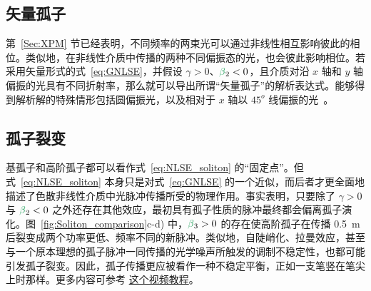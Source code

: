 \subsection{矢量孤子}
第~\ref{Sec:XPM} 节已经表明，不同频率的两束光可以通过非线性相互影响彼此的相位。类似地，在非线性介质中传播的两种不同偏振态的光，也会彼此影响相位。若采用矢量形式的式~\ref{eq:GNLSE}，并假设 $\gamma>0$、$\betag_2<0$，且介质对沿 $x$ 轴和 $y$ 轴偏振的光具有不同折射率，那么就可以导出所谓“矢量孤子”的解析表达式。能够得到解析解的特殊情形包括圆偏振光，以及相对于 $x$ 轴以 $45^o$ 线偏振的光~\cite{AGRAWAL_CH6_POL}。

\subsection{孤子裂变}
\label{subsec:fission}
基孤子和高阶孤子都可以看作式~\ref{eq:NLSE_soliton} 的“固定点”。但式~\ref{eq:NLSE_soliton} 本身只是对式~\ref{eq:GNLSE} 的一个近似，而后者才更全面地描述了色散非线性介质中光脉冲传播所受的物理作用。事实表明，只要除了 $\gamma>0$ 与 $\betag_2<0$ 之外还存在其他效应，最初具有孤子性质的脉冲最终都会偏离孤子演化。图~\ref{fig:Soliton_comparison}c-d) 中，$\betag_3>0$ 的存在使高阶孤子在传播 0.5~m 后裂变成两个功率更低、频率不同的新脉冲。类似地，自陡峭化、拉曼效应，甚至与一个原本理想的孤子脉冲一同传播的光学噪声所触发的调制不稳定性，也都可能引发孤子裂变。因此，孤子传播更应被看作一种不稳定平衡，正如一支笔竖在笔尖上时那样。更多内容可参考 \href{https://youtu.be/tHpIR2Kuxp0}{这个视频教程}。
